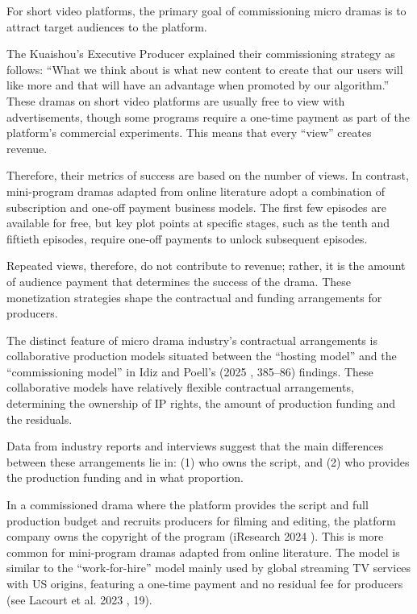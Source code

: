 \documentclass[10pt,a4paper]{article}
\begin{document}
For short video platforms, the primary goal of commissioning micro dramas is to attract target audiences to the platform.\par
The Kuaishou’s Executive Producer explained their commissioning strategy as follows: “What we think about is what new content to create that our users will like more and that will have an advantage when promoted by our algorithm.” These dramas on short video platforms are usually free to view with advertisements, though some programs require a one-time payment as part of the platform’s commercial experiments. This means that every “view” creates revenue.\par
Therefore, their metrics of success are based on the number of views. In contrast, mini-program dramas adapted from online literature adopt a combination of subscription and one-off payment business models. The first few episodes are available for free, but key plot points at specific stages, such as the tenth and fiftieth episodes, require one-off payments to unlock subsequent episodes.\par
Repeated views, therefore, do not contribute to revenue; rather, it is the amount of audience payment that determines the success of the drama. These monetization strategies shape the contractual and funding arrangements for producers.\par
The distinct feature of micro drama industry’s contractual arrangements is collaborative production models situated between the “hosting model” and the “commissioning model” in Idiz and Poell’s (2025 , 385–86) findings. These collaborative models have relatively flexible contractual arrangements, determining the ownership of IP rights, the amount of production funding and the residuals.\par
Data from industry reports and interviews suggest that the main differences between these arrangements lie in: (1) who owns the script, and (2) who provides the production funding and in what proportion.\par
In a commissioned drama where the platform provides the script and full production budget and recruits producers for filming and editing, the platform company owns the copyright of the program (iResearch 2024 ). This is more common for mini-program dramas adapted from online literature. The model is similar to the “work-for-hire” model mainly used by global streaming TV services with US origins, featuring a one-time payment and no residual fee for producers (see Lacourt et al. 2023 , 19).\par
\end{document}
